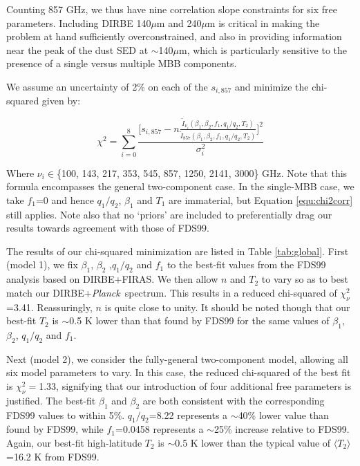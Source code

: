 \documentclass{emulateapj}
\newcommand{\PLANCK}{{\it Planck}}
\begin{document}
Counting 857 GHz, we thus have nine correlation slope constraints for six 
free parameters. Including DIRBE 140$\mu$m and 240$\mu$m is critical in making 
the problem at hand sufficiently overconstrained, and also in providing 
information near the peak of the dust SED at $\sim$140$\mu$m, which is 
particularly sensitive to the presence of a single versus multiple MBB 
components. 

We assume an uncertainty of 2\% on each of the $s_{i, 857}$ and minimize the 
chi-squared given by:

\begin{equation} \label{equ:chi2corr}
\chi^2 = \sum_{i=0}^{8}\frac{\big[s_{i, 857}-n\frac{\tilde{I}_{\nu_i}(\beta_1, \beta_2, f_1, q_1/q_2, T_2)}{\tilde{I}_{857}(\beta_1, \beta_2, f_1, q_1/q_2, T_2)}\big]^2}{\sigma_{i}^2}
\end{equation}

Where $\nu_i$$\in$\{100, 143, 217, 353, 545, 857, 1250, 2141, 3000\} GHz. Note 
that this formula encompasses the general two-component case. In the single-MBB
case, we take $f_1$=0 and hence $q_1/q_2$, $\beta_1$ and $T_1$ are immaterial, 
but Equation \ref{equ:chi2corr} still applies. Note also that no `priors' are
included to preferentially drag our results towards agreement with those of 
FDS99.

The results of our chi-squared minimization are listed in Table 
\ref{tab:global}. First (model 1), we fix $\beta_1$, $\beta_2$ ,$q_1/q_2$ and
$f_1$ to the best-fit values from the FDS99 analysis based on DIRBE+FIRAS. We
then allow $n$ and $T_2$ to vary so as to best match our 
DIRBE+\PLANCK~spectrum. This results in a reduced chi-squared of 
$\chi^2_{\nu}$=3.41. Reassuringly, $n$ is quite close to unity. It should be 
noted though that our best-fit $T_2$ is $\sim$0.5 K lower than that found by 
FDS99 for the same values of $\beta_1$, $\beta_2$, $q_1/q_2$ and $f_1$.

Next (model 2), we consider the fully-general two-component model, allowing all
 six model parameters to vary. In this case, the reduced chi-squared of the 
best fit is $\chi^2_{\nu}=$1.33, signifying that our introduction of four 
additional free parameters is justified. The best-fit $\beta_1$ and $\beta_2$ 
are both consistent with the corresponding FDS99 values to within 5\%. 
$q_1/q_2$=8.22 represents a $\sim$40\% lower value than found by FDS99, while
$f_1$=0.0458 represents a $\sim$25\% increase relative to FDS99. Again, our
best-fit high-latitude $T_2$ is $\sim$0.5 K lower than the typical value of 
$\langle T_2 \rangle$=16.2 K from FDS99.
\end{document}
